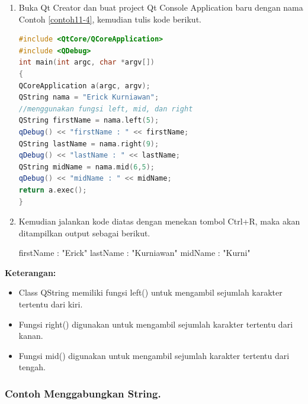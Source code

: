 \begin{enumerate}

\item
  Buka Qt Creator dan buat project Qt Console Application baru dengan
  nama Contoh \ref{contoh11-4}, kemudian tulis kode berikut.

\begin{lstlisting}[language=c++,caption= Menggunakan Fungsi Left Mid Right, label=contoh11-4]
#include <QtCore/QCoreApplication>
#include <QDebug>
int main(int argc, char *argv[])
{
QCoreApplication a(argc, argv);
QString nama = "Erick Kurniawan";
//menggunakan fungsi left, mid, dan right
QString firstName = nama.left(5);
qDebug() << "firstName : " << firstName;
QString lastName = nama.right(9);
qDebug() << "lastName : " << lastName;
QString midName = nama.mid(6,5);
qDebug() << "midName : " << midName;
return a.exec();
}
\end{lstlisting}
\item
  Kemudian jalankan kode diatas dengan menekan tombol Ctrl+R, maka akan
  ditampilkan output sebagai berikut.

  \begin{lcverbatim}
  firstName :  "Erick"
lastName :  "Kurniawan"
midName :  "Kurni"
\end{lcverbatim}
\end{enumerate}

\textbf{Keterangan:}

\begin{itemize}

\item
  Class QString memiliki fungsi left() untuk mengambil sejumlah karakter
  tertentu dari kiri.
\item
  Fungsi right() digunakan untuk mengambil sejumlah karakter tertentu
  dari kanan.
\item
  Fungsi mid() digunakan untuk mengambil sejumlah karakter tertentu dari
  tengah.
\end{itemize}

\subsubsection*{Contoh Menggabungkan String.}

